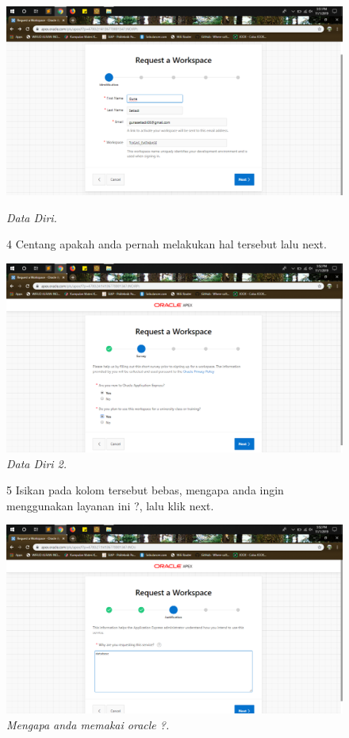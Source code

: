 \begin{enumerate}
\begin{figure}[!htbp]
    \begin{center}
\includegraphics[scale=0.2]{figures/g1.png}
    \caption{\textit{Data Diri.}}
        \end{center}
        
\item[4]Centang apakah anda pernah melakukan hal tersebut lalu next.  

    \begin{center}
\includegraphics[scale=0.2]{figures/g2.png}
    \caption{\textit{Data Diri 2.}}
        \end{center}
        \end{figure}
\begin{figure}
\item[5]Isikan pada kolom tersebut bebas, mengapa anda ingin menggunakan layanan ini ?, lalu klik next.

    \begin{center}
\includegraphics[scale=0.2]{figures/g3.png}
    \caption{\textit{Mengapa anda memakai oracle ?.}}
        \end{center}


\end{figure}
\end{enumerate}
